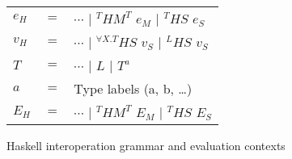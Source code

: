 \begin{figure}[p]
\centering
\begin{tabular}{lcl}
\vspace{5pt}

$e_{H}$ & $=$ & $\cdots$ $\vert$ $^{T}HM^{T}$ $e_{M}$ $\vert$ $^{T}HS$ $e_{S}$ \\

\vspace{5pt}

$v_{H}$ & $=$ & $\cdots$ $\vert$ $^{\forall X.T}HS$ $v_{S}$ $\vert$ $^{L}HS$ $v_{S}$ \\

\vspace{5pt}

$T$ & $=$ & $\cdots$ $\vert$ $L$ $\vert$ $T^{a}$ \\

\vspace{5pt}

$a$ & $=$ & Type labels (a, b, \ldots) \\

\vspace{5pt}

$E_{H}$ & $=$ & $\cdots$ $\vert$ $^{T}HM^{T}$ $E_{M}$ $\vert$ $^{T}HS$ $E_{S}$
\end{tabular}
\caption{Haskell interoperation grammar and evaluation contexts}
\label{ihg}
\end{figure}